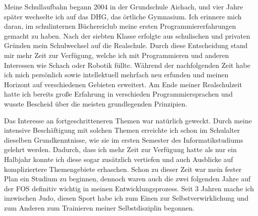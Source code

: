 \documentclass{scrartcl}
\begin{document}
%
%


Meine Schullaufbahn begann 2004 in der Grundschule Aichach, und vier Jahre später wechselte ich auf das DHG,
das örtliche Gymnasium. Ich erinnere mich daran, im schulinternen Büchereiclub meine ersten Programmiererfahrungen
gemacht zu haben.
Nach der siebten Klasse erfolgte aus schulischen und privaten Gründen mein Schulwechsel auf die Realschule.
Durch diese Entscheidung stand mir mehr Zeit zur Verfügung, welche ich mit Programmieren und anderen Interessen
wie Schach oder Robotik füllte. Während der nachfolgenden Zeit habe ich mich persönlich sowie intellektuell
mehrfach neu erfunden und meinen Horizont auf verschiedenen Gebieten erweitert. Am Ende meiner Realschulzeit
hatte ich bereits große Erfahrung in verschieden Programmiersprachen und wusste Bescheid über die meisten
grundlegenden Prinzipien.

Das Interesse an fortgeschritteneren Themen war natürlich geweckt.
Durch meine intensive Beschäftigung mit solchen Themen erreichte ich schon im Schulalter dieselben Grundkenntnisse,
wie sie im ersten Semester des Informatikstudiums gelehrt werden. Dadurch, dass ich mehr Zeit zur Verfügung hatte
als nur ein Halbjahr konnte ich diese sogar zusätzlich vertiefen und auch Ausblicke auf kompliziertere Themengebiete
erhaschen. Schon zu dieser Zeit war mein fester Plan ein Studium zu beginnen, dennoch waren auch die zwei folgenden
Jahre auf der FOS definitiv wichtig in meinen Entwicklungsprozess.
Seit 3 Jahren mache ich inzwischen Judo, diesen Sport habe ich zum Einen zur Selbstverwirklichung und zum Anderen zum
Trainieren meiner Selbstdisziplin begonnen.
\end{document}
